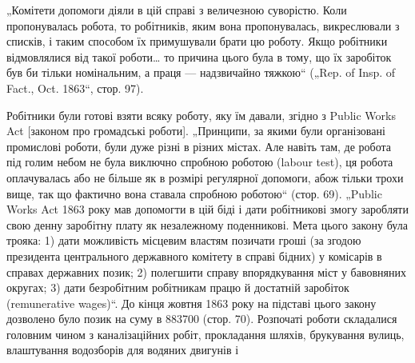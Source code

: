 „Комітети допомоги діяли в цій справі з величезною суворістю.
Коли пропонувалась робота, то робітників, яким вона пропонувалась,
викреслювали з списків, і таким способом їх примушували
брати цю роботу. Якщо робітники відмовлялися від такої роботи\dots{}
то причина цього була в тому, що їх заробіток був би тільки
номінальним, а праця — надзвичайно тяжкою“ („Rep. of Insp. of
Fact., Oct. 1863“, стор. 97).

Робітники були готові взяти всяку роботу, яку їм давали,
згідно з Public Works Act [законом про громадські роботи].
„Принципи, за якими були організовані промислові роботи, були
дуже різні в різних містах. Але навіть там, де робота під голим
небом не була виключно спробною роботою (labour test), ця
робота оплачувалась або не більше як в розмірі регулярної
допомоги, абож тільки трохи вище, так що фактично вона ставала
спробною роботою“ (стор. 69). „Public Works Act 1863 року
мав допомогти в цій біді і дати робітникові змогу заробляти свою
денну заробітну плату як незалежному поденникові. Мета цього
закону була трояка: 1) дати можливість місцевим властям позичати
гроші (за згодою президента центрального державного
комітету в справі бідних) у комісарів в справах державних позик;
2) полегшити справу впорядкування міст у бавовняних округах;
3) дати безробітним робітникам працю й достатній заробіток
(remunerative wages)“. До кінця жовтня 1863 року на підставі
цього закону дозволено було позик на суму в \num{883700} (стор. 70). Розпочаті роботи складалися головним
чином з каналізаційних робіт, прокладання шляхів, брукування
вулиць, влаштування водозборів для водяних двигунів і~

